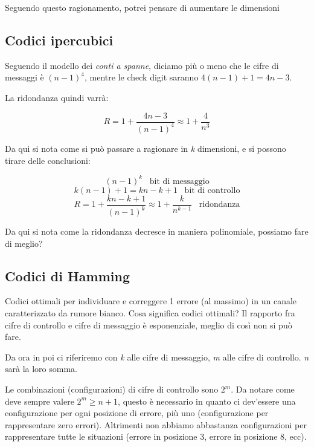 Seguendo questo ragionamento, potrei pensare di aumentare le dimensioni

\subsection*{Codici ipercubici}

Seguendo il modello dei \textit{conti a spanne}, diciamo più o meno che le cifre di messaggi è $(n-1)^4$, mentre le check digit saranno $4(n-1)+1=4n-3$.

La ridondanza quindi varrà:

\begin{equation}
R = 1 + \frac{4n-3}{(n-1)^4} \approx 1 + \frac{4}{n^3}
\end{equation}

Da qui si nota come si può passare a ragionare in \textit{k} dimensioni, e si possono tirare delle conclusioni:

\begin{equation}
(n-1)^k \; \; \; \text{bit di messaggio}
\end{equation}
\begin{equation*}
k(n-1)+1 = kn-k+1 \; \; \; \text{bit di controllo}
\end{equation*}
\begin{equation*}
R = 1 + \frac{kn-k+1}{(n-1)^k} \approx 1 + \frac{k}{n^{k-1}} \; \; \; \text{ridondanza}
\end{equation*}

\smallskip

Da qui si nota come la ridondanza decresce in maniera polinomiale, possiamo fare di meglio?

\subsection*{Codici di Hamming}

Codici ottimali per individuare e correggere 1 errore (al massimo) in un canale caratterizzato da rumore bianco.
Cosa significa codici ottimali? Il rapporto fra cifre di controllo e cifre di messaggio è esponenziale, meglio di così non si può fare.

Da ora in poi ci riferiremo con \textit{k} alle cifre di messaggio, \textit{m} alle cifre di controllo. \textit{n} sarà la loro somma.

Le combinazioni (configurazioni) di cifre di controllo sono $2^m$.
Da notare come deve sempre valere $2^m \geq n+1$, questo è necessario in quanto ci dev'essere una configurazione per ogni posizione di errore, più uno (configurazione per rappresentare zero errori).
Altrimenti non abbiamo abbastanza configurazioni per rappresentare tutte le situazioni (errore in posizione 3, errore in posizione 8, ecc).\\

